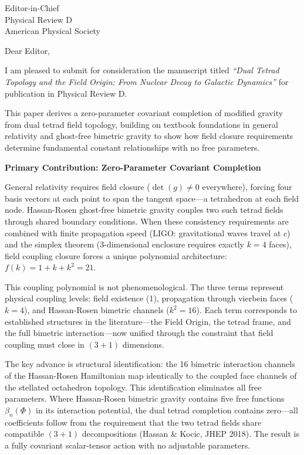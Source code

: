 \documentclass[11pt]{letter}
\begin{document}
\begin{letter}{%
Editor-in-Chief\\
Physical Review D\\
American Physical Society
}

\opening{Dear Editor,}

I am pleased to submit for consideration the manuscript titled \textit{``Dual Tetrad Topology and the Field Origin: From Nuclear Decay to Galactic Dynamics''} for publication in Physical Review D.

This paper derives a zero-parameter covariant completion of modified gravity from dual tetrad field topology, building on textbook foundations in general relativity and ghost-free bimetric gravity to show how field closure requirements determine fundamental constant relationships with no free parameters.

\textbf{Primary Contribution: Zero-Parameter Covariant Completion}

General relativity requires field closure ($\det(g) \neq 0$ everywhere), forcing four basis vectors at each point to span the tangent space---a tetrahedron at each field node. Hassan-Rosen ghost-free bimetric gravity couples two such tetrad fields through shared boundary conditions. When these consistency requirements are combined with finite propagation speed (LIGO: gravitational waves travel at $c$) and the simplex theorem (3-dimensional enclosure requires exactly $k = 4$ faces), field coupling closure forces a unique polynomial architecture: $f(k) = 1 + k + k^2 = 21$.

This coupling polynomial is not phenomenological. The three terms represent physical coupling levels: field existence (1), propagation through vierbein faces ($k = 4$), and Hassan-Rosen bimetric channels ($k^2 = 16$). Each term corresponds to established structures in the literature---the Field Origin, the tetrad frame, and the full bimetric interaction---now unified through the constraint that field coupling must close in $(3+1)$ dimensions.

The key advance is structural identification: the 16 bimetric interaction channels of the Hassan-Rosen Hamiltonian map identically to the coupled face channels of the stellated octahedron topology. This identification eliminates all free parameters. Where Hassan-Rosen bimetric gravity contains five free functions $\beta_n(\Phi)$ in its interaction potential, the dual tetrad completion contains zero---all coefficients follow from the requirement that the two tetrad fields share compatible $(3+1)$ decompositions (Hassan \& Kocic, JHEP 2018). The result is a fully covariant scalar-tensor action with no adjustable parameters.


\end{letter}
\end{document}

